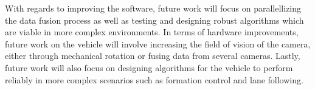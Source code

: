 \documentclass[conference]{IEEEtran}
\begin{document}
With regards to improving the software, future work will focus on parallellizing the data fusion process as well as testing and designing robust algorithms which are viable in more complex environments. In terms of hardware improvements, future work on the vehicle will involve increasing the field of vision of the camera, either through mechanical rotation or fusing data from several cameras. Lastly, future work will also focus on designing algorithms for the vehicle to perform reliably in more complex scenarios such as formation control and lane following. 


 




\end{document}
